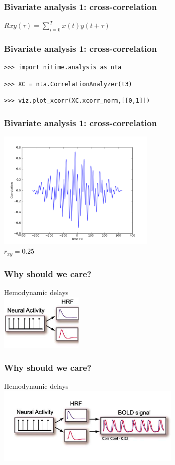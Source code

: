 \documentclass{beamer}
\begin{document}
\begin{frame}
\frametitle{Bivariate analysis 1: cross-correlation}
$Rxy(\tau) = \sum_{i=0}^{T}{x(t)y(t+\tau)}$
\end{frame}

\begin{frame}[fragile]
\frametitle{Bivariate analysis 1: cross-correlation}
\pause
\begin{lstlisting}
>>> import nitime.analysis as nta
\end{lstlisting}

\pause
\begin{lstlisting}
>>> XC = nta.CorrelationAnalyzer(t3) 
\end{lstlisting}

\pause
\begin{lstlisting}
>>> viz.plot_xcorr(XC.xcorr_norm,[[0,1]])
\end{lstlisting}
\end{frame}

\begin{frame}
\frametitle{Bivariate analysis 1: cross-correlation}
\includegraphics[height=5.7cm]{figures/outa_phase_xcorr}
\pause 
\\
$r_{xy}=0.25$
\end{frame}

\begin{frame}
\frametitle{Why should we care? }
Hemodynamic delays
\\
\includegraphics[height=2.7cm]{figures/hemo}
\end{frame}

\begin{frame}
\frametitle{Why should we care?}
Hemodynamic delays
\\
\includegraphics[height=3.7cm]{figures/tseries_w_hemo}
\end{frame}
\end{document}
